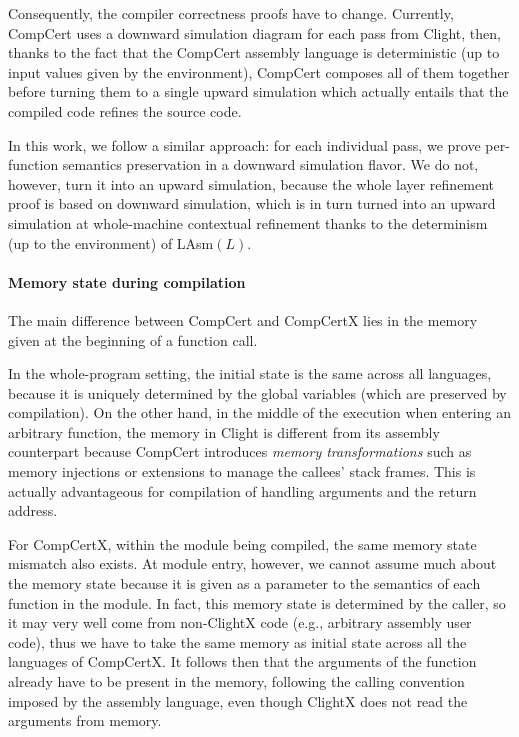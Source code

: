 Consequently, the compiler correctness proofs have to
change. Currently, CompCert uses a downward simulation diagram
\cite[2.1]{Leroy-backend} for each pass from Clight, then, thanks to
the fact that the CompCert assembly language is deterministic (up to
input values given by the environment), CompCert composes all of them
together before turning them to a single upward simulation which
actually entails that the compiled code refines the source code.

In this work, we follow a similar approach: for each individual pass,
we prove per-function semantics preservation in a downward simulation
flavor.
We do not, however, turn it
into an upward simulation, because the whole
layer refinement proof is based on downward simulation,
which is in turn turned into an upward simulation at
whole-machine contextual refinement thanks to the determinism (up to
the environment) of LAsm$(L)$.


\paragraph{Memory state during compilation}

The main difference between CompCert and CompCertX lies in the memory
given at the beginning of a function call.

In the whole-program setting, the initial state is the same
across all languages, because it is uniquely determined by
the global variables (which are preserved by compilation).
On the other hand, in the middle of the execution
when entering an arbitrary function,
the memory in Clight is different from its assembly counterpart
because CompCert introduces \emph{memory transformations} such as
memory injections or extensions \cite[5.4]{leroy08}
to manage the callees' stack frames.
This is actually advantageous for compilation
of handling arguments and the return address.

For CompCertX, within the module being compiled, the same memory state
mismatch also exists.
At module entry, however, we cannot assume much about the
memory state because it is given as a parameter to
the semantics of each function in the module. In fact, this memory
state is determined by the caller, so it may very well come from
non-ClightX code (e.g., arbitrary assembly user code), thus we have to
take the same memory as initial state across all the languages of
CompCertX. It follows then that the arguments of the function already
have to be present in the memory, following the calling convention
imposed by the assembly language, even though ClightX does not read
the arguments from memory.

